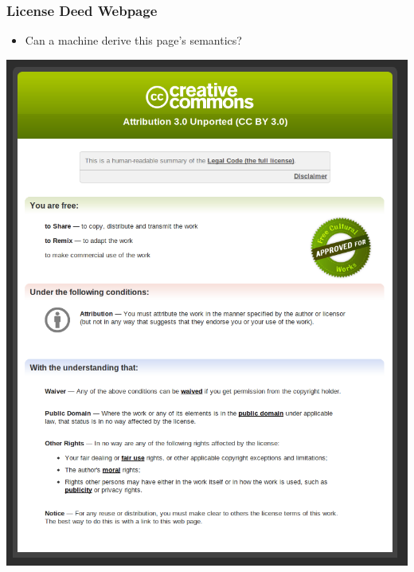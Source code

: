 \documentclass[mathserif,xcolor=dvipsnames,hyperref={bookmarks=true}]{beamer}
\begin{document}
\begin{frame}[t]
\frametitle{License Deed Webpage}
        \begin{itemize}
            \item Can a machine derive this page's semantics?
        \end{itemize}
        \begin{center}
            \includegraphics[height=0.8\textheight]{cc-deed-rendered-in-browser.png}
        \end{center}
\end{frame}
\end{document}
